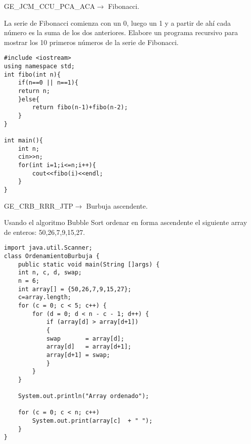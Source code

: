 \begin{center}
	GE\_JCM\_CCU\_PCA\_ACA$\longrightarrow$ Fibonacci.
\end{center}

La serie de Fibonacci comienza con un 0, luego un 1 y a partir de ahí cada número es la suma de los dos anteriores. Elabore un programa recursivo para mostrar los 10 primeros números de la serie de Fibonacci.

\lstset{language=C, breaklines=true, basicstyle=\footnotesize}
\begin{lstlisting}
#include <iostream>
using namespace std;
int fibo(int n){
	if(n==0 || n==1){
	return n;
	}else{
		return fibo(n-1)+fibo(n-2);
	}  
}

int main(){
	int n;
	cin>>n;
	for(int i=1;i<=n;i++){
		cout<<fibo(i)<<endl;
	}
}
\end{lstlisting}
\clearpage

\begin{center}
	GE\_CRB\_RRR\_JTP$\longrightarrow$ Burbuja ascendente.
\end{center}

Usando el algoritmo Bubble Sort ordenar en forma ascendente el siguiente array de enteros: 50,26,7,9,15,27.

\lstset{language=Java, breaklines=true, basicstyle=\footnotesize}
\begin{lstlisting}
import java.util.Scanner;
class OrdenamientoBurbuja {
	public static void main(String []args) {
	int n, c, d, swap;    
	n = 6; 
	int array[] = {50,26,7,9,15,27};
	c=array.length;
	for (c = 0; c < 5; c++) {
		for (d = 0; d < n - c - 1; d++) {
			if (array[d] > array[d+1]) 
			{
			swap       = array[d];
			array[d]   = array[d+1];
			array[d+1] = swap;
			}
		}
	}
	
	System.out.println("Array ordenado");
	
	for (c = 0; c < n; c++) 
		System.out.print(array[c]  + " ");
	}
}
\end{lstlisting}
\vspace{0.5cm}


